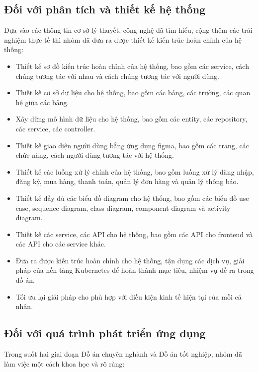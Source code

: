 \subsection{Đối với phân tích và thiết kế hệ thống}
\noindent Dựa vào các thông tin cơ sở lý thuyết, công nghệ đã tìm hiểu, cộng thêm các trải nghiệm thực tế thì nhóm đã đưa ra được thiết kế kiến trúc hoàn chỉnh của hệ thống:
\begin{itemize}
    \item Thiết kế sơ đồ kiến trúc hoàn chỉnh của hệ thống, bao gồm các service, cách chúng tương tác với nhau và 
cách chúng tương tác với người dùng.
    \item Thiết kế cơ sở dữ liệu cho hệ thống, bao gồm các bảng, các trường, các quan hệ giữa các bảng.
    \item Xây dừng mô hình dữ liệu cho hệ thống, bao gồm các entity, các repository, các service, các controller.
    \item Thiết kế giao diện người dùng bằng ứng dụng figma, bao gồm các trang, các chức năng, cách người dùng tương tác với hệ thống.
    \item Thiết kế các luồng xử lý chính của hệ thống, bao gồm luồng xử lý đăng nhập, đăng ký, mua hàng, thanh toán, quản lý đơn hàng và quản lý thông báo.
    \item Thiết kế đầy đủ các biểu đồ diagram cho hệ thống, bao gồm các biểu đồ use case, sequence diagram, class diagram, component diagram và activity diagram.
    \item Thiết kế các service, các API cho hệ thống, bao gồm các API cho frontend và các API cho các service khác.
    \item Đưa ra được kiến trúc hoàn chỉnh cho hệ thống, tận dụng các dịch vụ, giải pháp của nền tảng 
Kubernetes để hoàn thành mục tiêu, nhiệm vụ đề ra trong đồ án.
    \item Tối ưu lại giải pháp cho phù hợp với điều kiện kinh tế hiện tại của mỗi cá nhân.
\end{itemize}
\subsection{Đối với quá trình phát triển ứng dụng}
\noindent Trong suốt hai giai đoạn Đồ án chuyên nghành và Đồ án tốt nghiệp, nhóm đã làm việc một cách khoa học và rõ ràng:
